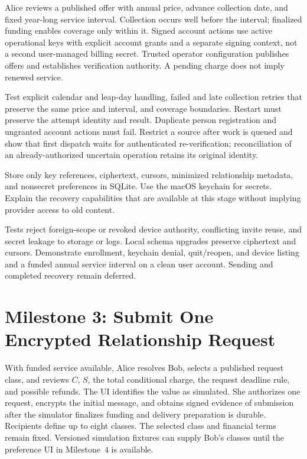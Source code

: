 \documentclass[11pt]{article}
\begin{document}
Alice reviews a published offer with annual price, advance collection date, and
fixed year-long service interval. Collection occurs well before the interval;
finalized funding enables coverage only within it. Signed account actions use
active operational keys with explicit account grants and a separate signing
context, not a second user-managed billing secret. Trusted operator configuration
publishes offers and establishes verification authority. A pending charge does
not imply renewed service.

Test explicit calendar and leap-day handling, failed and late collection retries
that preserve the same price and interval, and coverage boundaries. Restart must
preserve the attempt identity and result. Duplicate person registration and
ungranted account actions must fail. Restrict a source after work is queued and
show that first dispatch waits for authenticated re-verification; reconciliation
of an already-authorized uncertain operation retains its original identity.

Store only key references, ciphertext, cursors, minimized relationship metadata,
and nonsecret preferences in SQLite. Use the macOS keychain for secrets. Explain
the recovery capabilities that are available at this stage without implying
provider access to old content.

Tests reject foreign-scope or revoked device authority, conflicting invite reuse,
and secret leakage to storage or logs. Local schema upgrades preserve ciphertext
and cursors. Demonstrate enrollment, keychain denial, quit/reopen, and device
listing and a funded annual service interval on a clean user account. Sending
and completed recovery remain deferred.

\section{Milestone 3: Submit One Encrypted Relationship Request}

With funded service available, Alice resolves Bob, selects a published request
class, and reviews $C$, $S$, the total
conditional charge, the request
deadline rule, and possible refunds. The UI identifies the value as simulated.
She authorizes one request, encrypts the initial message, and obtains signed
evidence of submission after the simulator finalizes funding and delivery
preparation is durable.
Recipients define up to eight classes. The selected class and financial terms remain fixed. Versioned simulation fixtures
can supply Bob's classes until the preference UI in Milestone~4 is available.
\end{document}
